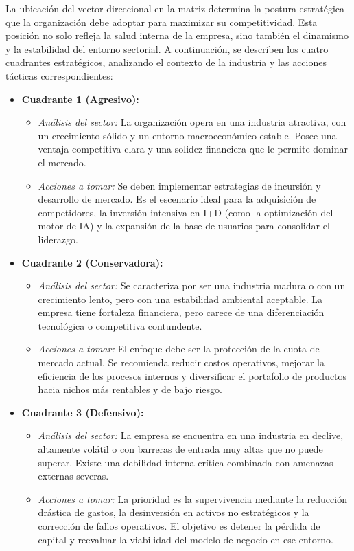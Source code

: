 La ubicación del vector direccional en la matriz determina la postura estratégica que la organización debe adoptar para maximizar su competitividad. Esta posición no solo refleja la salud interna de la empresa, sino también el dinamismo y la estabilidad del entorno sectorial. A continuación, se describen los cuatro cuadrantes estratégicos, analizando el contexto de la industria y las acciones tácticas correspondientes:

\begin{itemize}
	\item \textbf{Cuadrante 1 (Agresivo):}
	\begin{itemize}
		\item \textit{Análisis del sector:} La organización opera en una industria atractiva, con un crecimiento sólido y un entorno macroeconómico estable. Posee una ventaja competitiva clara y una solidez financiera que le permite dominar el mercado.
		\item \textit{Acciones a tomar:} Se deben implementar estrategias de incursión  y desarrollo de mercado. Es el escenario ideal para la adquisición de competidores, la inversión intensiva en I+D (como la optimización del motor de IA) y la expansión de la base de usuarios para consolidar el liderazgo.
	\end{itemize}
	
	\item \textbf{Cuadrante 2 (Conservadora):}
	\begin{itemize}
		\item \textit{Análisis del sector:} Se caracteriza por ser una industria madura o con un crecimiento lento, pero con una estabilidad ambiental aceptable. La empresa tiene fortaleza financiera, pero carece de una diferenciación tecnológica o competitiva contundente.
		\item \textit{Acciones a tomar:} El enfoque debe ser la protección de la cuota de mercado actual. Se recomienda reducir costos operativos, mejorar la eficiencia de los procesos internos y diversificar el portafolio de productos hacia nichos más rentables y de bajo riesgo.
	\end{itemize}
	
	\item \textbf{Cuadrante 3 (Defensivo):}
	\begin{itemize}
		\item \textit{Análisis del sector:} La empresa se encuentra en una industria en declive, altamente volátil o con barreras de entrada muy altas que no puede superar. Existe una debilidad interna crítica combinada con amenazas externas severas.
		\item \textit{Acciones a tomar:} La prioridad es la supervivencia mediante la reducción drástica de gastos, la desinversión en activos no estratégicos y la corrección de fallos operativos. El objetivo es detener la pérdida de capital y reevaluar la viabilidad del modelo de negocio en ese entorno.
	\end{itemize}
	

\end{itemize}
